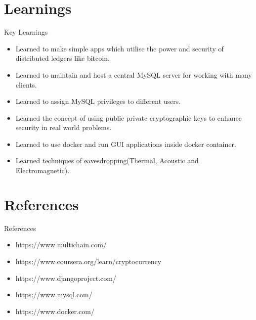 \documentclass{beamer}
\begin{document}
\section{Learnings}
\begin{frame}{Key Learnings}
\begin{itemize}
\item Learned to make simple apps which utilise the power and security of distributed ledgers like bitcoin.
\item Learned to maintain and host a central MySQL server for working with many clients.
\item Learned to assign MySQL privileges to different users.
\item Learned the concept of using public private cryptographic keys to enhance security in real world problems.
\item Learned to use docker and run GUI applications inside docker container. 
\item Learned techniques of eavesdropping(Thermal, Acoustic and Electromagnetic). 
\end{itemize}
\end{frame}

\section{References}
\begin{frame}{References}
\begin{itemize}
    \item https://www.multichain.com/ 
    \item https://www.coursera.org/learn/cryptocurrency
    \item https://www.djangoproject.com/
    \item https://www.mysql.com/
    \item https://www.docker.com/
\end{itemize}    
\end{frame}
\end{document}
